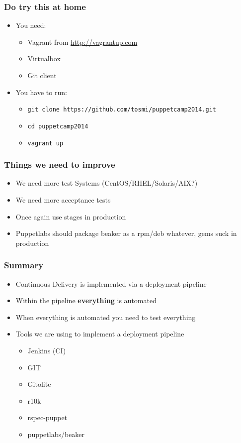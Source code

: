 \documentclass{beamer}
\begin{document}
\begin{frame}
  \frametitle{Do try this at home}

  \begin{itemize}
  \item You need:
    \begin{itemize}
    \item Vagrant from \url{http://vagrantup.com}
    \item Virtualbox
    \item Git client
    \end{itemize}
  \item You have to run:
    \begin{itemize}
    \item \texttt{git clone https://github.com/tosmi/puppetcamp2014.git}
    \item \texttt{cd puppetcamp2014}
    \item \texttt{vagrant up}
    \end{itemize}
  \end{itemize}
\end{frame}

\begin{frame}
  \frametitle{Things we need to improve}

  \begin{itemize}
  \item We need more test Systems (CentOS/RHEL/Solaris/AIX?)
  \item We need more acceptance tests
  \item Once again use stages in production
  \item Puppetlabs should package beaker as a rpm/deb whatever, gems
    suck in production
  \end{itemize}
\end{frame}

\begin{frame}
  \frametitle{Summary}

  \begin{itemize}
  \item<1-> Continuous Delivery is implemented via a deployment pipeline
  \item<2-> Within the pipeline \textbf{everything} is automated
  \item<3-> When everything is automated you need to test everything
  \item<4-> Tools we are using to implement a deployment pipeline
    \begin{itemize}
    \item Jenkins (CI)
    \item GIT
    \item Gitolite
    \item r10k
    \item rspec-puppet
    \item puppetlabs/beaker
    \end{itemize}
  \end{itemize}
\end{frame}

\begin{frame}
\end{frame}
\end{document}
